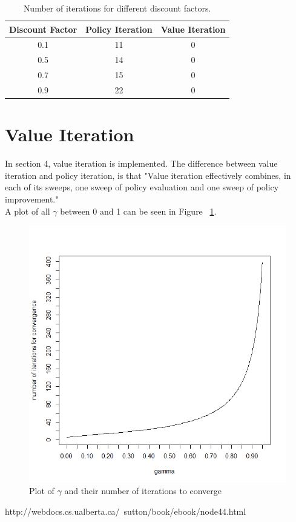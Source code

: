 \documentclass[11pt]{article}
\begin{document}
\begin{center}
\begin{table}[ht]
{\small
\hfill{}
\begin{tabular}{c|c|c}
\textbf{Discount Factor} & \textbf{Policy Iteration} & \textbf{Value Iteration}\\
	\hline
0.1 & 11 & 0\\
0.5 & 14 & 0\\
0.7 & 15 & 0\\
0.9 & 22 & 0\\
\end{tabular}}
\hfill{}
\caption{Number of iterations for different discount factors.}
\label{table:gamma=0.8}
\end{table}
\end{center}

\section{Value Iteration}
In section 4, value iteration is implemented. The difference between value iteration and policy iteration, is that "Value iteration effectively combines, in each of its sweeps, one sweep of policy evaluation and one sweep of policy improvement." \cite{barto1}\\
A plot of all $\gamma$ between 0 and 1 can be seen in Figure ~\ref{plot}.
\begin{figure}
\centering
\includegraphics[scale=0.8]{a14.png}
\caption{Plot of $\gamma$ and their number of iterations to converge}
\label{plot}
\end{figure}






\begin{thebibliography}{7}

 http://webdocs.cs.ualberta.ca/~sutton/book/ebook/node44.html


\end{thebibliography}
\end{document}
